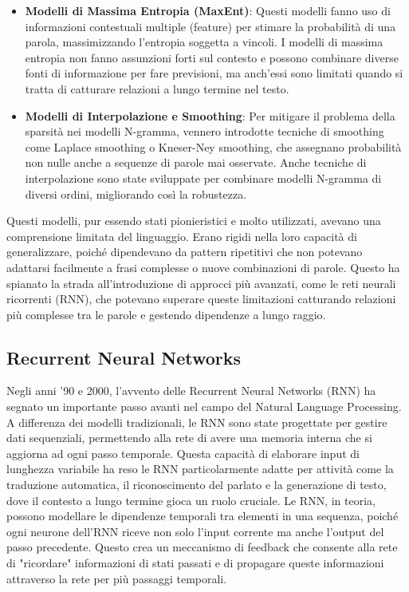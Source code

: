 \begin{itemize}
	\item \textbf{Modelli di Massima Entropia (MaxEnt)}: Questi modelli fanno uso di informazioni contestuali multiple (feature) per stimare la probabilità di una parola, massimizzando l'entropia soggetta a vincoli. I modelli di massima entropia non fanno assunzioni forti sul contesto e possono combinare diverse fonti di informazione per fare previsioni, ma anch'essi sono limitati quando si tratta di catturare relazioni a lungo termine nel testo.
	\item \textbf{Modelli di Interpolazione e Smoothing}: Per mitigare il problema della sparsità nei modelli N-gramma, vennero introdotte tecniche di smoothing come Laplace smoothing o Kneser-Ney smoothing, che assegnano probabilità non nulle anche a sequenze di parole mai osservate. Anche tecniche di interpolazione sono state sviluppate per combinare modelli N-gramma di diversi ordini, migliorando così la robustezza.
\end{itemize}
Questi modelli, pur essendo stati pionieristici e molto utilizzati, avevano una comprensione limitata del linguaggio. Erano rigidi nella loro capacità di generalizzare, poiché dipendevano da pattern ripetitivi che non potevano adattarsi facilmente a frasi complesse o nuove combinazioni di parole. Questo ha spianato la strada all'introduzione di approcci più avanzati, come le reti neurali ricorrenti (RNN), che potevano superare queste limitazioni catturando relazioni più complesse tra le parole e gestendo dipendenze a lungo raggio.

\subsection{Recurrent Neural Networks}
Negli anni '90 e 2000, l'avvento delle Recurrent Neural Networks (RNN) ha segnato un importante passo avanti nel campo del Natural Language Processing. A differenza dei modelli tradizionali, le RNN sono state progettate per gestire dati sequenziali, permettendo alla rete di avere una memoria interna che si aggiorna ad ogni passo temporale. Questa capacità di elaborare input di lunghezza variabile ha reso le RNN particolarmente adatte per attività come la traduzione automatica, il riconoscimento del parlato e la generazione di testo, dove il contesto a lungo termine gioca un ruolo cruciale.
Le RNN, in teoria, possono modellare le dipendenze temporali tra elementi in una sequenza, poiché ogni neurone dell'RNN riceve non solo l'input corrente ma anche l'output del passo precedente. Questo crea un meccanismo di feedback che consente alla rete di "ricordare" informazioni di stati passati e di propagare queste informazioni attraverso la rete per più passaggi temporali.

